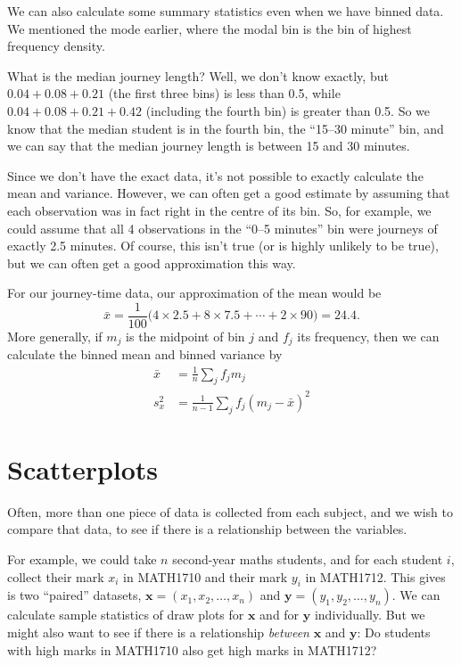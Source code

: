 \documentclass[
  a4paper,
]{book}
\theoremstyle{definition}
\theoremstyle{definition}
\theoremstyle{definition}
\theoremstyle{definition}
\theoremstyle{remark}
\begin{document}
We can also calculate some summary statistics even when we have binned data. We mentioned the mode earlier, where the modal bin is the bin of highest frequency density.

What is the median journey length? Well, we don't know exactly, but \(0.04 + 0.08 + 0.21\) (the first three bins) is less than 0.5, while \(0.04 + 0.08 + 0.21 + 0.42\) (including the fourth bin) is greater than 0.5. So we know that the median student is in the fourth bin, the ``15--30 minute'' bin, and we can say that the median journey length is between 15 and 30 minutes.

Since we don't have the exact data, it's not possible to exactly calculate the mean and variance. However, we can often get a good estimate by assuming that each observation was in fact right in the centre of its bin. So, for example, we could assume that all 4 observations in the ``0--5 minutes'' bin were journeys of exactly 2.5 minutes. Of course, this isn't true (or is highly unlikely to be true), but we can often get a good approximation this way.

For our journey-time data, our approximation of the mean would be
\[ \bar x = \frac{1}{100} \big(4\times 2.5 + 8 \times 7.5 + \cdots + 2\times90) = 24.4 . \]
More generally, if \(m_j\) is the midpoint of bin \(j\) and \(f_j\) its frequency, then we can calculate the binned mean and binned variance by
\begin{align*}
  \bar x &= \frac{1}{n} \sum_j f_j m_j \\
  s^2_x  &= \frac{1}{n-1} \sum_j f_j (m_j - \bar x)^2
\end{align*}

\hypertarget{scatterplots}{%
\section{Scatterplots}\label{scatterplots}}

Often, more than one piece of data is collected from each subject, and we wish to compare that data, to see if there is a relationship between the variables.

For example, we could take \(n\) second-year maths students, and for each student \(i\), collect their mark \(x_i\) in MATH1710 and their mark \(y_i\) in MATH1712. This gives is two ``paired'' datasets, \(\mathbf x = (x_1, x_2, \dots, x_n)\) and \(\mathbf y = (y_1, y_2, \dots, y_n)\). We can calculate sample statistics of draw plots for \(\mathbf x\) and for \(\mathbf y\) individually. But we might also want to see if there is a relationship \emph{between} \(\mathbf x\) and \(\mathbf y\): Do students with high marks in MATH1710 also get high marks in MATH1712?
\end{document}

